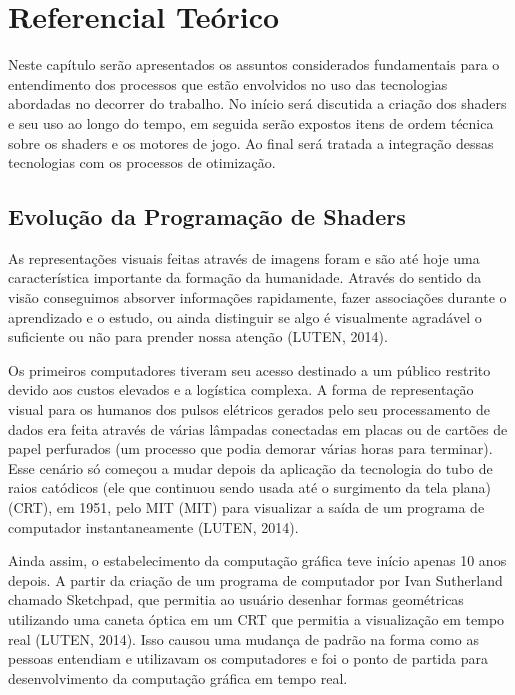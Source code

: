 \chapter{Referencial Teórico}
\label{cap:referencial-teorico}

Neste capítulo serão apresentados os assuntos considerados fundamentais para o entendimento dos processos que estão envolvidos no uso das tecnologias abordadas no decorrer do trabalho. No início será discutida a criação dos shaders e seu uso ao longo do tempo, em seguida serão expostos itens de ordem técnica sobre os shaders e os motores de jogo. Ao final será tratada a integração dessas tecnologias com os processos de otimização.

\section{Evolução da Programação de Shaders}
\label{sec:historia-evolucao-programacao-shaders}

As representações visuais feitas através de imagens foram e são até hoje uma característica importante da formação da humanidade. Através do sentido da visão conseguimos absorver informações rapidamente, fazer associações durante o aprendizado e o estudo, ou ainda distinguir se algo é visualmente agradável o suficiente ou não para prender nossa atenção (LUTEN, 2014)\nocite{openGLBook}.

Os primeiros computadores tiveram seu acesso destinado a um público restrito devido aos custos elevados e a logística complexa. A forma de representação visual para os humanos dos pulsos elétricos gerados pelo seu processamento de dados era feita através de várias lâmpadas conectadas em placas ou de cartões de papel perfurados (um processo que podia demorar várias horas para terminar). Esse cenário só começou a mudar depois da aplicação da tecnologia do tubo de raios catódicos (ele que continuou sendo usada até o surgimento da tela plana) (\acrshort{CRT}), em 1951, pelo MIT (\acrlong{MIT}) para visualizar a saída de um programa de computador instantaneamente (LUTEN, 2014)\nocite{openGLBook}.

Ainda assim, o estabelecimento da computação gráfica teve início apenas 10 anos depois. A partir da criação de um programa de computador por Ivan Sutherland chamado Sketchpad, que permitia ao usuário desenhar formas geométricas utilizando uma caneta óptica em um \acrshort{CRT} que permitia a visualização em tempo real (LUTEN, 2014)\nocite{openGLBook}. Isso causou uma mudança de padrão na forma como as pessoas entendiam e utilizavam os computadores e foi o ponto de partida para desenvolvimento da computação gráfica em tempo real.

